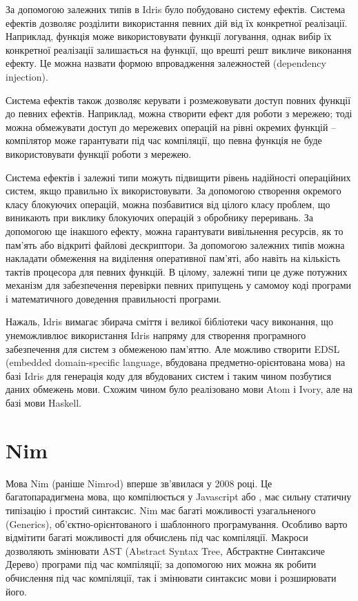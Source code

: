 \documentclass[oneside,14pt,a4paper,final]{myextreport}
\begin{document}
За допомогою залежних типів в Idris було побудовано систему ефектів. Система ефектів дозволяє розділити використання певних дій від їх конкретної реалізації. Наприклад, функція може використовувати функції логування, однак вибір їх конкретної реалізації залишається на функції, що врешті решт викличе виконання ефекту. Це можна назвати формою впровадження залежностей (dependency injection). 


Система ефектів також дозволяє керувати і розмежовувати доступ повних функції до певних ефектів. Наприклад, можна створити ефект для роботи з мережею; тоді можна обмежувати доступ до мережевих операцій на рівні окремих функцій -- компілятор може гарантувати під час компіляції, що певна функція не буде використовувати функції роботи з мережею.

Система ефектів і залежні типи можуть підвищити рівень надійності операційних систем, якщо правильно їх використовувати. За допомогою створення окремого класу блокуючих операцій, можна позбавитися від цілого класу проблем, що виникають при виклику блокуючих операцій з обробнику переривань. За допомогою ще інакшого ефекту, можна гарантувати вивільнення ресурсів, як то пам'ять або відкриті файлові дескриптори. За допомогою залежних типів можна накладати обмеження на виділення оперативної пам'яті, або навіть на кількість тактів процесора для певних функцій. В цілому, залежні типи це дуже потужних механізм для забезпечення перевірки певних припущень у самомоу коді програми і математичного доведення правильності програми.

Нажаль, Idris вимагає збирача сміття і великої бібліотеки часу виконання, що унеможливлює використання Idris напряму для створення програмного забезпечення для систем з обмеженою пам'яттю. Але можливо створити EDSL (embedded domain-specific language, вбудована предметно-орієнтована мова) на базі Idris для генерація коду для вбудованих систем і таким чином позбутися даних обмежень мови. Схожим чином було реалізовано мови Atom\cite{haskell:atom} і Ivory\cite{haskell:ivory}, але на базі мови Haskell\cite{haskell}.

\section{Nim}

Мова Nim\cite{nim} (раніше Nimrod) вперше зв'явилася у 2008 році. Це багатопарадигмена мова, що компілюється у Javascript або \LangC{}, має сильну статичну типізацію і простий синтаксис. Nim має багаті можливості узагальненого (Generics), об'єктно-орієнтованого і шаблонного програмування. Особливо варто відмітити багаті можливості для обчислень під час компіляції. Макроси дозволяють змінювати AST (Abstract Syntax Tree, Абстрактне Синтаксиче Дерево) програми під час компіляції; за допомогою них можна як робити обчислення під час компіляції, так і змінювати синтаксис мови і розширювати його.
\end{document}
